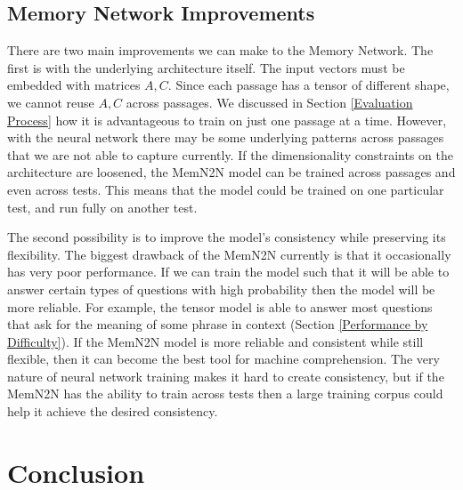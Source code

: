 \documentclass[pageno]{final_paper}
\begin{document}
\subsection{Memory Network Improvements}
\label{Memory Network Improvements}

There are two main improvements we can make to the Memory Network. The first is
with the underlying architecture itself. The input vectors must be embedded with
matrices $A,C$. Since each passage has a tensor of different shape, we cannot
reuse $A,C$ across passages. We discussed in Section \ref{Evaluation Process}
how it is advantageous to train on just one passage at a time. However, with the
neural network there may be some underlying patterns across passages that we are
not able to capture currently. If the dimensionality constraints on the
architecture are loosened, the MemN2N model can be trained across passages and
even across tests. This means that the model could be trained on one particular
test, and run fully on another test.

The second possibility is to improve the model's consistency while preserving
its flexibility. The biggest drawback of the MemN2N currently is that it
occasionally has very poor performance. If we can train the model such that it
will be able to answer certain types of questions with high probability then the
model will be more reliable. For example, the tensor model is able to answer
most questions that ask for the meaning of some phrase in context (Section
\ref{Performance by Difficulty}). If the MemN2N model is more reliable and
consistent while still flexible, then it can become the best tool for machine
comprehension. The very nature of neural network training makes it hard to
create consistency, but if the MemN2N has the ability to train across tests then
a large training corpus could help it achieve the desired consistency.

\section{Conclusion}
\label{Conclusion}
\end{document}
